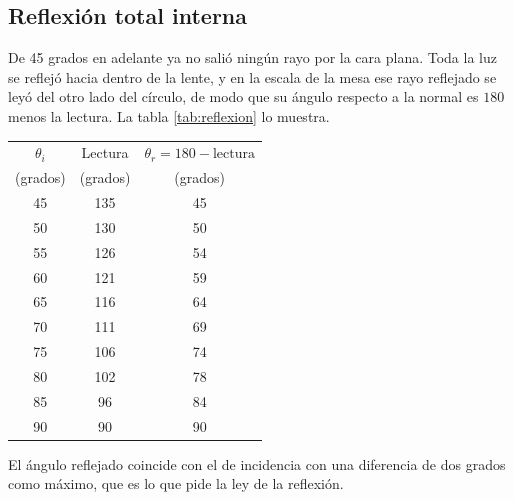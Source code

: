 \subsection{Reflexión total interna}
De 45 grados en adelante ya no salió ningún rayo por la cara plana. Toda la luz se reflejó hacia dentro de la lente, y en la escala de la mesa ese rayo reflejado se leyó del otro lado del círculo, de modo que su ángulo respecto a la normal es $180$ menos la lectura. La tabla \ref{tab:reflexion} lo muestra.

\begin{center}
\begin{tabular}{ccc}
\hline
$\theta_i$ & Lectura & $\theta_r = 180 - \text{lectura}$ \\
(grados) & (grados) & (grados) \\
\hline
45 & 135 & 45 \\
50 & 130 & 50 \\
55 & 126 & 54 \\
60 & 121 & 59 \\
65 & 116 & 64 \\
70 & 111 & 69 \\
75 & 106 & 74 \\
80 & 102 & 78 \\
85 & 96  & 84 \\
90 & 90  & 90 \\
\hline
\end{tabular}
\label{tab:reflexion}
\end{center}

El ángulo reflejado coincide con el de incidencia con una diferencia de dos grados como máximo, que es lo que pide la ley de la reflexión.
